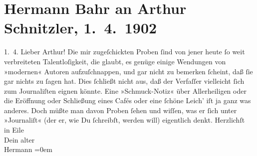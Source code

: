 

               \section[Hermann Bahr an Arthur Schnitzler, 1. 4. 1902]{ Hermann Bahr an Arthur Schnitzler, 1. 4. 1902}\nopagebreak{}\rehead{ }\begin{ledgroupsized}[t]{13cm}\normalsize\beginnumbering{} \toendnotes[C]{\smallbreak\pagebreak[2]} 
\toendnotes[C]{\smallbreak}\pstart
           \raggedleft{}{\pb}1. 4.\pend
           \pstart\center{}Lieber Arthur!\pend\pstart
           Die mir zugeſchickten Proben ſind von jener heute ſo weit verbreiteten
               Talentloſigkeit, die glaubt, es genüge einige Wendungen von »modernen« Autoren
               aufzuſchnappen, und gar nicht zu bemerken ſcheint, daß ſie gar nichts zu ſagen hat.
               Dies ſchließt nicht aus, daß der Ver{\pb}faſſer vielleicht ſich zum
               Journaliſten eignen könnte. Eine »Schmuck-Notiz« über Allerheiligen oder die
               Eröffnung oder Schließung eines Cafés oder eine ſchöne Leich’ iſt ja ganz was
               anderes. Doch müßte man davon Proben ſehen und wiſſen, was er ſich unter »Journaliſt«
               (der er, wie Du ſchreibſt, werden will) eigentlich denkt.\pend
           \pstart
           Herzlichſt{\\[\baselineskip]}in Eile{\\[\baselineskip]}Dein alter{\\[\baselineskip]}\spacefill\mbox{Hermann}\pend
           \leftskip=0em{}          \endnumbering{}\end{ledgroupsized}  \newcommand{\dateiname}{L01216}\newcommand{\titel}{Hermann Bahr an Arthur Schnitzler, 1. 4. 1902}\newcommand{\editorInnen}{ Kurt Ifkovits,  Martin Anton Müller}
      